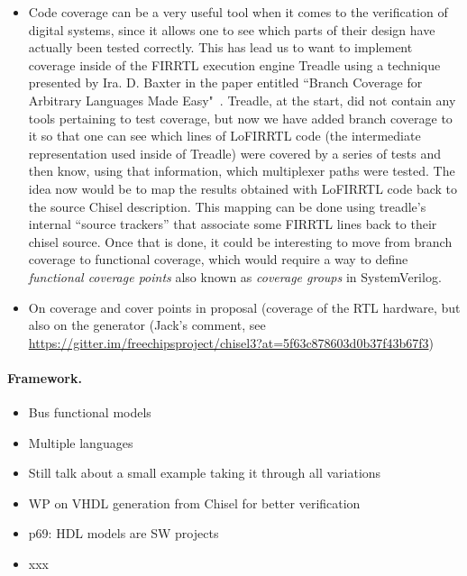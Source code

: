 \documentclass[fleqn,12pt]{article}
\begin{document}
\begin{itemize}
\item Code coverage can be a very useful tool when it comes to the verification of digital systems, since it allows one to see which parts of their design have actually been tested correctly. 
This has lead us to want to implement coverage inside of the FIRRTL execution engine Treadle using a technique presented by Ira. D. Baxter in the paper entitled “Branch Coverage for Arbitrary Languages Made Easy"~\cite{branch-cov-made-easy:2002}. Treadle, at the start, did not contain any tools pertaining to test coverage, but now we have added branch coverage to it so that one can see which lines of LoFIRRTL code (the intermediate representation used inside of Treadle) were covered by a series of tests and then know, using that information, which multiplexer paths were tested. 
The idea now would be to map the results obtained with LoFIRRTL code back to the source Chisel description. This mapping can be done using treadle’s internal “source trackers” that associate some FIRRTL lines back to their chisel source. Once that is done, it could be interesting to move from branch coverage to functional coverage, which would require a way to define \textit{functional coverage points} also known as \textit{coverage groups} in SystemVerilog.
\item On coverage and cover points in proposal (coverage of the RTL hardware, but also on the generator (Jack's comment, see \url{https://gitter.im/freechipsproject/chisel3?at=5f63c878603d0b37f43b67f3})
\end{itemize}

\paragraph{Framework.}

\begin{itemize}
\item Bus functional models
\item Multiple languages
\item Still talk about a small example taking it through all variations
\item WP on VHDL generation from Chisel for better verification
\item p69: HDL models are SW projects

\end{itemize}

\begin{itemize}
\item xxx
\end{itemize}
\end{document}
